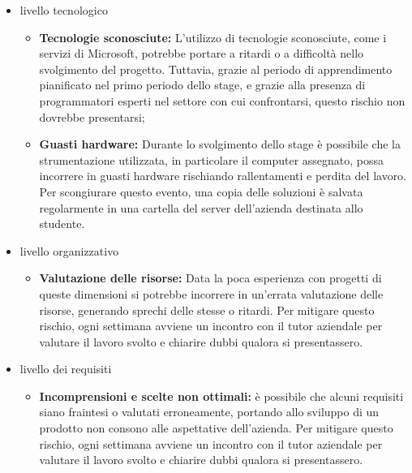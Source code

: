 \begin{itemize}
	\item livello tecnologico
	\begin{itemize}
		\item \textbf{Tecnologie sconosciute:} L'utilizzo di tecnologie sconosciute, come i servizi di Microsoft, potrebbe portare a ritardi o a difficoltà nello svolgimento del progetto. Tuttavia, grazie al periodo di apprendimento pianificato nel primo periodo dello stage, e grazie alla presenza di programmatori esperti nel settore con cui confrontarsi, questo rischio non dovrebbe presentarsi;
		\item \textbf{Guasti hardware:} Durante lo svolgimento dello stage è possibile che la strumentazione utilizzata, in particolare il computer assegnato, possa incorrere in guasti hardware rischiando rallentamenti e perdita del lavoro. Per scongiurare questo evento, una copia delle soluzioni è salvata regolarmente in una cartella del server dell'azienda destinata allo studente.   
	\end{itemize}
	\item livello organizzativo
	\begin{itemize}
		\item \textbf{Valutazione delle risorse:} Data la poca esperienza con progetti di queste dimensioni si potrebbe incorrere in un'errata valutazione delle risorse, generando sprechi delle stesse o ritardi. Per mitigare questo rischio, ogni settimana avviene un incontro con il tutor aziendale per valutare il lavoro svolto e chiarire dubbi qualora si presentassero.
	\end{itemize}
	\item livello dei requisiti
	\begin{itemize}
		\item \textbf{Incomprensioni e scelte non ottimali:} è possibile che alcuni requisiti siano fraintesi o valutati erroneamente, portando allo sviluppo di un prodotto non consono alle aspettative dell'azienda. Per mitigare questo rischio, ogni settimana avviene un incontro con il tutor aziendale per valutare il lavoro svolto e chiarire dubbi qualora si presentassero.
	\end{itemize}
\end{itemize}

